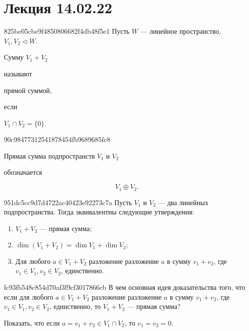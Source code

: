 \section{Лекция 14.02.22}
\begin{note}{825be05cbe9f4850806682f4db48f5e1}
    Пусть \( W \) --- линейное пространство, \( V_1, V_2 \triangleleft W \).
    \begin{icloze}{2}Сумму \( V_1 + V_2 \)\end{icloze} называют \begin{icloze}{1}прямой сум\-мой,\end{icloze} если \begin{icloze}{2}\( V_1 \cap V_2 = \{ 0 \} \).\end{icloze}
\end{note}

\begin{note}{90c98477312541878454fb9689685fc8}
    \begin{icloze}{2}Прямая сумма подпространств \( V_1 \) и \( V_2 \)\end{icloze} обозначается \begin{icloze}{1}
        \[
            V_1 \oplus V_2.
        \]
    \end{icloze}
\end{note}

\begin{note}{951dc5cc9d7d4722ac40423e92273c7a}
    Пусть \( V_1 \) и \( V_2 \) --- два линейных подпространства. Тогда эквивалентны следующие утверждения:
    \begin{enumerate}
        \item {}\begin{icloze}{1}\( V_1 + V_2 \) --- прямая сумма;\end{icloze}
        \item {}\begin{icloze}{2}\( \dim (V_1 + V_2) = \dim V_1 + \dim V_2 \);\end{icloze}
        \item {}\begin{icloze}{3}Для любого \( a \in V_1 + V_2 \) разложение разложение \( a \) в сумму \( v_1 + v_2 \), где \( v_1 \in V_1, v_2 \in V_2 \), единственно.\end{icloze}
    \end{enumerate}
\end{note}

\begin{note}{fc93fb548c854d70af3f9cf3017866cb}
    В чем основная идея доказательства того, что если для любого \( a \in V_1 + V_2 \) разложение разложение \( a \) в сумму \( v_1 + v_2 \), где \( v_1 \in V_1, v_2 \in V_2 \), единственно, то \( V_1 + V_2 \) --- прямая сумма?

    \begin{cloze}{1}
        Показать, что если \( a = v_1 + v_2 \in V_1 \cap V_2 \), то \( v_1 = v_2 = 0 \).
    \end{cloze}
\end{note}

